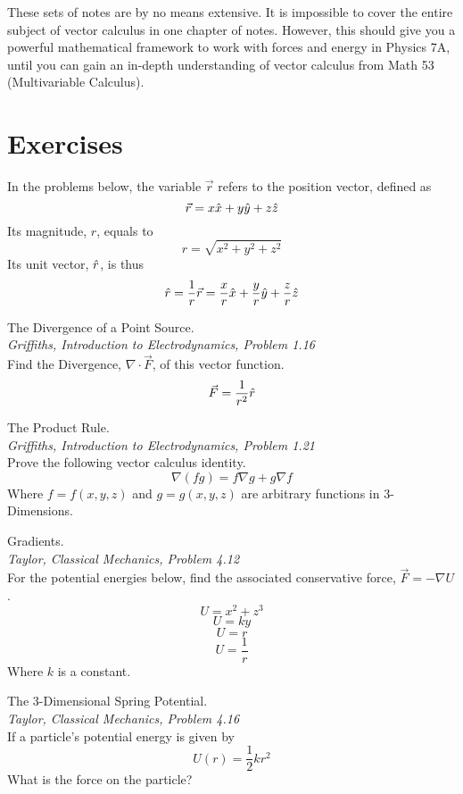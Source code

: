 \documentclass[11pt]{article}
\theoremstyle{gangnamstyle}{\newtheorem{definition}{Definition}[]}
\theoremstyle{gangnamstyle}{\newtheorem{example}{Example}[]}
\theoremstyle{gangnamstyle}{\newtheorem{problem}{Problem}[]}
\begin{document}
These sets of notes are by no means extensive. It is impossible to cover the entire subject of vector calculus in one chapter of notes. However, this should give you a powerful mathematical framework to work with forces and energy in Physics 7A, until you can gain an in-depth understanding of vector calculus from Math 53 (Multivariable Calculus). 

\pagebreak

\section{Exercises}

In the problems below, the variable $\Vec{r}$ refers to the position vector, defined as
\[ \Vec{r} = x\Hat{x} + y\Hat{y} + z\Hat{z} \]
Its magnitude, $r$, equals to
\[ r = \sqrt{x^2 + y^2 + z^2} \]
Its unit vector, $\Hat{r}$, is thus
\[ \Hat{r} = \frac{1}{r}\Vec{r} = \frac{x}{r}\Hat{x} + \frac{y}{r}\Hat{y} + \frac{z}{r}\Hat{z} \]

\begin{problem}
The Divergence of a Point Source. \\
\textit{Griffiths, Introduction to Electrodynamics, Problem 1.16} \\
Find the Divergence, $\nabla \cdot \Vec{F}$, of this vector function. 
\[ \Vec{F} = \frac{1}{r^2}\Hat{r} \]
\end{problem}

\begin{problem}
The Product Rule. \\
\textit{Griffiths, Introduction to Electrodynamics, Problem 1.21} \\
Prove the following vector calculus identity.
\[ \nabla(fg) = f\nabla g + g\nabla f \]
Where $f = f(x, y, z)$ and $g = g(x, y, z)$ are arbitrary functions in 3-Dimensions. 
\end{problem}

\begin{problem}
Gradients. \\
\textit{Taylor, Classical Mechanics, Problem 4.12} \\
For the potential energies below, find the associated conservative force, $\Vec{F} = -\nabla U$. 
\[ U = x^2 + z^3 \]
\[ U = ky \]
\[ U = r \]
\[ U = \frac{1}{r} \]
Where $k$ is a constant. 
\end{problem}

\pagebreak

\begin{problem}
The 3-Dimensional Spring Potential. \\
\textit{Taylor, Classical Mechanics, Problem 4.16} \\
If a particle's potential energy is given by 
\[ U(r) = \frac{1}{2}kr^2 \]
What is the force on the particle? 
\end{problem}
\end{document}
